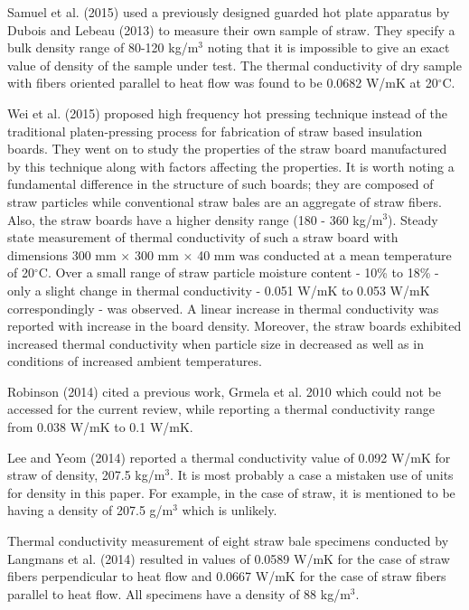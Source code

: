 \documentclass[]{article}
\begin{document}
 Samuel et al. (2015) used a previously designed guarded hot plate
apparatus by Dubois and Lebeau (2013) to measure their own sample of
straw. They specify a bulk density range of 80-120 kg/m\(^{3}\) noting
that it is impossible to give an exact value of density of the sample
under test. The thermal conductivity of dry sample with fibers oriented
parallel to heat flow was found to be 0.0682 W/mK at 20\(^{\circ}\)C.

 Wei et al. (2015) proposed high frequency hot pressing technique
instead of the traditional platen-pressing process for fabrication of
straw based insulation boards. They went on to study the properties of
the straw board manufactured by this technique along with factors
affecting the properties. It is worth noting a fundamental difference in
the structure of such boards; they are composed of straw particles while
conventional straw bales are an aggregate of straw fibers. Also, the
straw boards have a higher density range (180 - 360 kg/m\(^{3}\)).
Steady state measurement of thermal conductivity of such a straw board
with dimensions 300 mm \(\times\) 300 mm \(\times\) 40 mm was conducted
at a mean temperature of 20\(^{\circ}\)C. Over a small range of straw
particle moisture content - 10\% to 18\% - only a slight change in
thermal conductivity - 0.051 W/mK to 0.053 W/mK correspondingly - was
observed. A linear increase in thermal conductivity was reported with
increase in the board density. Moreover, the straw boards exhibited
increased thermal conductivity when particle size in decreased as well
as in conditions of increased ambient temperatures.

 Robinson (2014) cited a previous work, Grmela et al. 2010 which could
not be accessed for the current review, while reporting a thermal
conductivity range from 0.038 W/mK to 0.1 W/mK.

 Lee and Yeom (2014) reported a thermal conductivity value of 0.092 W/mK
for straw of density, 207.5 kg/m\(^{3}\). It is most probably a case a
mistaken use of units for density in this paper. For example, in the
case of straw, it is mentioned to be having a density of 207.5
g/m\(^{3}\) which is unlikely.

 Thermal conductivity measurement of eight straw bale specimens
conducted by Langmans et al. (2014) resulted in values of 0.0589 W/mK
for the case of straw fibers perpendicular to heat flow and 0.0667 W/mK
for the case of straw fibers parallel to heat flow. All specimens have a
density of 88 kg/m\(^{3}\).
\end{document}
